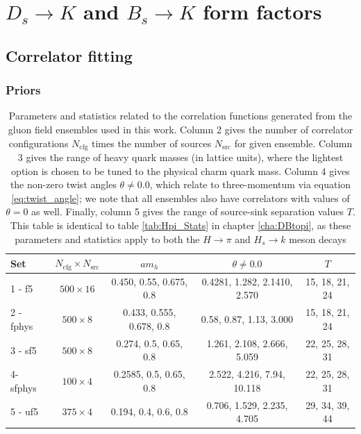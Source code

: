 \chapter{$D_s \rightarrow K$ and $B_s \rightarrow K$ form factors}\label{cha:DsBstoK}

\section{Correlator fitting}\label{sec:HsK_corr_priors}

\subsection{Priors}\label{sec:HsK_priors}

\begin{table}
\caption{Parameters and statistics related to the correlation functions generated from the gluon field ensembles used in this work.  Column 2 gives the number of correlator configurations $N_\mathrm{cfg}$ times the number of sources $N_\mathrm{src}$ for given ensemble.  Column 3 gives the range of heavy quark masses (in lattice units), where the lightest option is chosen to be tuned to the physical charm quark mass.  Column 4 gives the non-zero twist angles $\theta\neq0.0$, which relate to three-momentum via equation \ref{eq:twist_angle}; we note that all ensembles also have correlators with values of $\theta=0$ as well.  Finally, column 5 gives the range of source-sink separation values $T$.  This table is identical to table \ref{tab:Hpi_Stats} in chapter \ref{cha:DBtopi}, as these parameters and statistics apply to both the $H\rightarrow\pi$ and $H_s\rightarrow k$ meson decays}
\begin{center} 
\begin{tabular}{l c c c c}
\hline
      Set & $N_{\mathrm{cfg}}\times N_{\mathrm{src}}$ & $am_h$ & $\theta\neq0.0$ & $T$ \\
\hline
\hline
    1 - f5   &$500 \times 16$  & 0.450, 0.55, 0.675, 0.8 &  0.4281, 1.282, 2.1410, 2.570 & 15, 18, 21, 24 \\
\hline
    2 - fphys   & $500 \times 8$& 0.433, 0.555, 0.678, 0.8 &  0.58, 0.87, 1.13, 3.000 & 15, 18, 21, 24 \\
\hline
        3 - sf5 & $500 \times 8$& 0.274, 0.5, 0.65, 0.8 &  1.261, 2.108, 2.666, 5.059 & 22, 25, 28, 31 \\
\hline
    4- sfphys &$100 \times 4$& 0.2585, 0.5, 0.65, 0.8 &  2.522, 4.216, 7.94, 10.118 & 22, 25, 28, 31 \\
\hline
    5 - uf5 & $375 \times 4$& 0.194, 0.4, 0.6, 0.8 & 0.706, 1.529, 2.235, 4.705 & 29, 34, 39, 44 \\
\hline
\hline
\end{tabular}
\end{center}
\label{tab:HsK_Stats}
\end{table}



